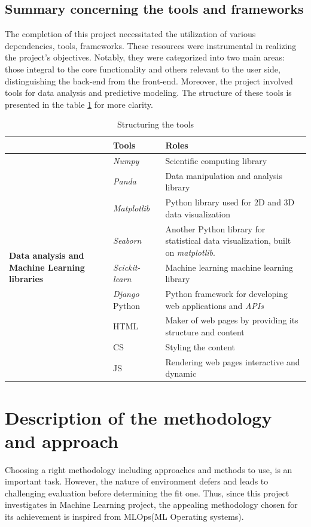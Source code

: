 \documentclass[12pt,a4paper, oneside]{book}
\begin{document}
\subsection{Summary concerning the tools and frameworks}
The completion of this project necessitated the utilization of various dependencies, tools, frameworks. These resources were instrumental in realizing the project's objectives. Notably, they were categorized into two main areas: those integral to the core functionality and others relevant to the user side, distinguishing the back-end from the front-end. Moreover, the project involved tools for data analysis and predictive modeling. The structure of these tools is presented in the  table \ref{tableStructuring}  for more clarity.
  \\
\begin{table}
\begin{tabular}{|p{4.1cm}|p{4cm}|p{6cm}|}
	\cline{2-3} 
    \multicolumn{1}{c|}{} &  \textbf{Tools}   &  \textbf{Roles}  \\
	\hline
\multirow{11}{4cm}{\textbf{Data analysis and Machine Learning libraries}}	& \textit{Numpy} & Scientific computing library   \\ 
	\cline{2-3} 
	& \textit{Panda}  & Data manipulation and
	analysis library  \\ 
	\cline{2-3} 
	& \textit{Matplotlib}  & Python library used for 2D and 3D data visualization   \\ 
	\cline{2-3}  
	& \textit{Seaborn} & Another Python library for statistical data visualization, built on \textit{matplotlib}.\\
	\cline{2-3} 
		& \textit{Scickit-learn}  & Machine learning machine learning library \\
	\hline
	\multirow{5}{4cm}{\textbf{Programming Languages (\textit{Front-end} and \textit{Back-end})}}& \textit{Django} Python & Python framework for developing web applications and \textit{APIs}\\ 
	 \cline{2-3}
	 & HTML & Maker of web pages by providing
	 its structure and content \\ 
	 \cline{2-3}
	 & CS & Styling the content\\ 
	 \cline{2-3}
	 & JS & Rendering web pages interactive and dynamic \\
	 \hline
	
\end{tabular}
\caption{Structuring the tools} 
\label{tableStructuring}
\end{table} 
\section{Description of the methodology and approach}
Choosing a right methodology including approaches and methods to use, is an important task. However, the nature of environment defers and leads to challenging evaluation before determining the fit one. Thus, since this project investigates in Machine Learning project, the appealing methodology chosen for its achievement is inspired from MLOps(ML Operating systems).
\end{document}
